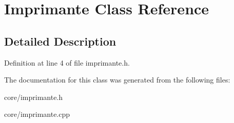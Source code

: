 \hypertarget{class_imprimante}{
\section{Imprimante Class Reference}
\label{class_imprimante}
}


\subsection{Detailed Description}


Definition at line 4 of file imprimante.h.



The documentation for this class was generated from the following files:\begin{DoxyCompactItemize}
\item 
core/imprimante.h\item 
core/imprimante.cpp\end{DoxyCompactItemize}
